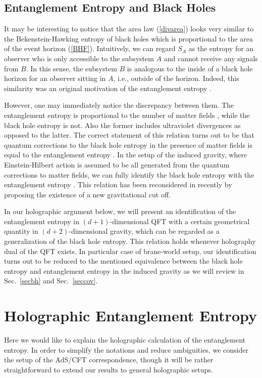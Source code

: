 \documentclass[12pt]{article}
\begin{document}
\subsection{Entanglement Entropy and Black Holes}
\label{EEBH}
\hspace{5mm}
It may be interesting to notice that the area law (\ref{divarea})
looks very similar to the Bekenstein-Hawking entropy
of black holes
which is proportional to the area of the event horizon (\ref{BHF}).
Intuitively, we can regard $S_A$
as the entropy for an observer who is only accessible to the
subsystem $A$ and cannot receive any signals from $B$. In this
sense, the subsystem $B$ is analogous to the inside of a black hole
horizon for an observer sitting in $A$, i.e., outside of the
horizon. Indeed, this similarity was an original motivation of the
entanglement entropy \cite{Thooft,Bombelli,Srednicki}.

However, one may immediately notice the discrepancy between them.
The entanglement entropy is proportional to the number of matter fields
, while the black hole entropy is
not. Also the former includes ultraviolet
divergences as opposed to the latter.  The correct statement of this
relation turns out to be that quantum corrections to the
black hole entropy in the presence of matter fields is equal to
the entanglement entropy \cite{SuUg,FPST,Jacobson:1994iw,Solok}. In the setup
of the induced gravity, where Einstein-Hilbert action is assumed to be
all generated from the quantum corrections to matter fields, we can fully identify
the black hole entropy with the entanglement entropy \cite{Jacobson:1994iw}.
This relation has been reconsidered in \cite{Dvali:2008jb} recently by proposing the existence of
a new gravitational cut off.

In our holographic argument below, we will present an identification of the entanglement entropy
in $(d+1)$-dimensional QFT
with a certain geometrical quantity in $(d+2)$-dimensional gravity, which can be regarded as a generalization of
the black hole entropy. This relation holds whenever holography dual of the QFT exists.
In particular case of brane-world setup, our identification turns out to be reduced to the
mentioned equivalence between the black hole entropy and entanglement entropy
in the induced gravity \cite{HMS,Emparan:2006ni,Solodukhin:2006xv}
as we will review in Sec.\ \ref{secbh} and Sec.\ \ref{seccov}.


\section{Holographic Entanglement Entropy}
\label{holographic} \setcounter{equation}{0} \hspace{5mm}
Here we would like to explain the holographic calculation of the entanglement entropy.
In order to simplify the notations and reduce ambiguities,
we consider the setup of the AdS/CFT correspondence, though it will be rather straightforward to
extend our results to general holographic setups.
\end{document}
